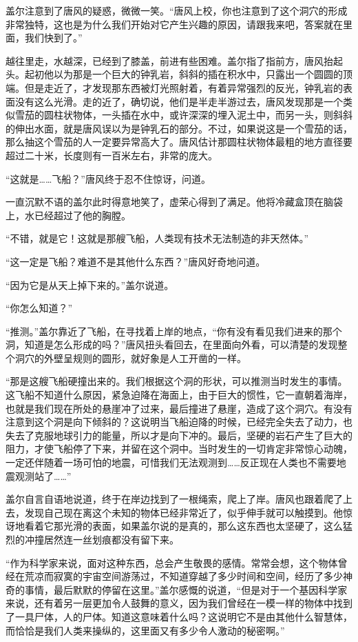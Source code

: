 盖尔注意到了唐风的疑惑，微微一笑。“唐风上校，你也注意到了这个洞穴的形成非常独特，这也是为什么我们开始对它产生兴趣的原因，请跟我来吧，答案就在里面，我们快到了。”

越往里走，水越深，已经到了膝盖，前进有些困难。盖尔指了指前方，唐风抬起头。起初他以为那是一个巨大的钟乳岩，斜斜的插在积水中，只露出一个圆圆的顶端。但是走近了，才发现那东西被灯光照射着，有着异常强烈的反光，钟乳岩的表面没有这么光滑。走的近了，确切说，他们是半走半游过去，唐风发现那是一个类似雪茄的圆柱状物体，一头插在水中，或许深深的埋入泥土中，而另一头，则斜斜的伸出水面，就是唐风误以为是钟乳石的部分。不过，如果说这是一个雪茄的话，那么抽这个雪茄的人一定要异常高大了。唐风估计那圆柱状物体最粗的地方直径要超过二十米，长度则有一百米左右，非常的庞大。

“这就是……飞船？”唐风终于忍不住惊讶，问道。

一直沉默不语的盖尔此时得意地笑了，虚荣心得到了满足。他将冷藏盒顶在脑袋上，水已经超过了他的胸膛。

“不错，就是它！这就是那艘飞船，人类现有技术无法制造的非天然体。”

“这一定是飞船？难道不是其他什么东西？”唐风好奇地问道。

“因为它是从天上掉下来的。”盖尔说道。

“你怎么知道？”

“推测。”盖尔靠近了飞船，在寻找着上岸的地点，“你有没有看见我们进来的那个洞，知道是怎么形成的吗？”唐风扭头看回去，在里面向外看，可以清楚的发现整个洞穴的外壁呈规则的圆形，就好象是人工开凿的一样。

“那是这艘飞船硬撞出来的。我们根据这个洞的形状，可以推测当时发生的事情。这飞船不知道什么原因，紧急迫降在海面上，由于巨大的惯性，它一直朝着海岸，也就是我们现在所处的悬崖冲了过来，最后撞进了悬崖，造成了这个洞穴。有没有注意到这个洞是向下倾斜的？这说明当飞船迫降的时候，已经完全失去了动力，也失去了克服地球引力的能量，所以才是向下冲的。最后，坚硬的岩石产生了巨大的阻力，才使飞船停了下来，并留在这个洞中。当时发生的一切肯定非常惊心动魄，一定还伴随着一场可怕的地震，可惜我们无法观测到……反正现在人类也不需要地震观测站了……”

盖尔自言自语地说道，终于在岸边找到了一根绳索，爬上了岸。唐风也跟着爬了上去，发现自己现在离这个未知的物体已经非常近了，似乎伸手就可以触摸到。他惊讶地看着它那光滑的表面，如果盖尔说的是真的，那么这东西也太坚硬了，这么猛烈的冲撞居然连一丝划痕都没有留下来。

“作为科学家来说，面对这种东西，总会产生敬畏的感情。常常会想，这个物体曾经在荒凉而寂寞的宇宙空间游荡过，不知道穿越了多少时间和空间，经历了多少神奇的事情，最后默默的停留在这里。”盖尔感慨的说道，“但是对于一个基因科学家来说，还有着另一层更加令人鼓舞的意义，因为我们曾经在一模一样的物体中找到了一具尸体，人的尸体。知道这意味着什么吗？这说明它不是由其他什么智慧体，而恰恰是我们人类来操纵的，这里面又有多少令人激动的秘密啊。”

